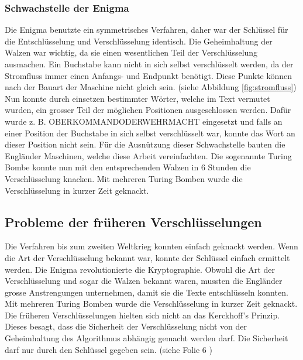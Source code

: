 \subsubsection{Schwachstelle der Enigma}
Die Enigma benutzte ein symmetrisches Verfahren, daher war der Schlüssel für die Entschlüsselung und Verschlüsselung identisch. %
Die Geheimhaltung der Walzen war wichtig, da sie einen wesentlichen Teil der Verschlüsselung ausmachen.
Ein Buchstabe kann nicht in sich selbst verschlüsselt werden, da der Stromfluss immer einen Anfangs- und Endpunkt benötigt. Diese Punkte können nach der Bauart der Maschine nicht gleich sein. (siehe Abbildung \ref{fig:stromfluss})
Nun konnte durch einsetzen bestimmter Wörter, welche im Text vermutet wurden, ein grosser Teil der möglichen Positionen ausgeschlossen werden. Dafür wurde z. B. OBERKOMMANDODERWEHRMACHT eingesetzt und falls an einer Position der Buchstabe in sich selbst verschlüsselt war, konnte das Wort an dieser Position nicht sein. Für die Ausnützung dieser Schwachstelle bauten die Engländer Maschinen, welche diese Arbeit vereinfachten. Die sogenannte Turing Bombe konnte nun mit den entsprechenden Walzen in 6 Stunden die Verschlüsselung knacken. 
Mit mehreren Turing Bomben wurde die Verschlüsselung in kurzer Zeit geknackt. 
%
\subsection{Probleme der früheren Verschlüsselungen}
\label{sec:Probleme_der_frueheren_Verschluesselungen}
Die Verfahren bis zum zweiten Weltkrieg konnten einfach geknackt werden. Wenn die Art der Verschlüsselung bekannt war, konnte der Schlüssel einfach ermittelt werden. 
Die Enigma revolutionierte die Kryptographie. Obwohl die Art der Verschlüsselung und sogar die Walzen bekannt waren, mussten die Engländer grosse Anstrengungen unternehmen, damit sie die Texte entschlüsseln konnten. \\[2ex]
Mit mehreren Turing Bomben wurde die Verschlüsselung in kurzer Zeit geknackt. \\[2ex]
%
Die früheren Verschlüsselungen hielten sich nicht an das Kerckhoff's Prinzip. Dieses besagt, dass die Sicherheit der Verschlüsselung nicht von der Geheimhaltung des Algorithmus abhängig gemacht werden darf. Die Sicherheit darf nur durch den Schlüssel gegeben sein. (siehe Folie 6 \cite{kerckhoffsprinzip} )
%
